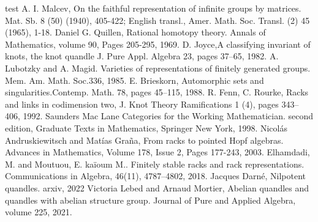 \documentclass[12pt, reqno]{amsart}
\begin{document}
\begin{thebibliography}{test}
 A. I. Malcev, \newblock On the faithful representation of infinite groups by matrices. \newblock Mat. Sb. 8 (50) (1940), 405-422; English transl., Amer. Math. Soc. Transl. (2) 45 (1965), 1-18.
Daniel G. Quillen, \newblock Rational homotopy theory. \newblock Annals of Mathematics, volume 90, Pages 205-295, 1969.
D. Joyce,\newblock A classifying invariant of knots, the knot quandle \newblock J. Pure Appl. Algebra 23, pages 37–65, 1982.
A. Lubotzky and A. Magid. \newblock Varieties of representations of finitely generated groups. \newblock Mem. Am. Math. Soc.336, 1985.
E. Brieskorn, \newblock Automorphic sets and singularities.\newblock Contemp. Math. 78, pages 45–115, 1988.
R. Fenn, C. Rourke, Racks and links in codimension two, J. Knot Theory Ramifications 1 (4), pages 343–406, 1992.
Saunders Mac Lane \newblock Categories for the Working Mathematician. \newblock second edition, Graduate Texts in Mathematics, Springer New York, 1998.
Nicol\'as Andruskiewitsch and Mat\'ias Gra\~na, \newblock From racks to pointed Hopf algebras. \newblock Advances in Mathematics, Volume 178, Issue 2, Pages 177-243, 2003.
Elhamdadi, M. and Moutuou, E. kaïoum M.. \newblock Finitely stable racks and rack representations. \newblock  Communications in Algebra, 46(11), 4787–4802, 2018.
Jacques Darné, \newblock Nilpotent quandles. \newblock arxiv, 2022
Victoria Lebed and Arnaud Mortier, \newblock Abelian quandles and quandles with abelian structure group. \newblock Journal of Pure and Applied Algebra, volume 225, 2021.



\end{thebibliography}


 


 
\end{document}
